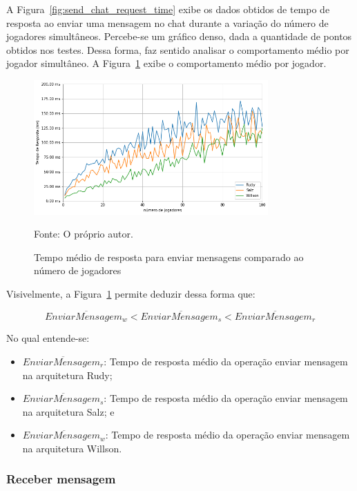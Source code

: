 A Figura~\ref{fig:send_chat_request_time} exibe os dados obtidos de tempo de resposta ao enviar uma mensagem no chat durante a variação do número de jogadores simultâneos.
%
Percebe-se um gráfico denso, dada a quantidade de pontos obtidos nos testes.
%
Dessa forma, faz sentido analisar o comportamento médio por jogador simultâneo.
%
A Figura~\ref{fig:send_chat_request_time_per_concurrency} exibe o comportamento médio por jogador.


\begin{figure}[htb!]
  \caption{Tempo médio de resposta para enviar mensagens comparado ao número de jogadores}
  \label{fig:send_chat_request_time_per_concurrency}
  \includegraphics[width=0.8\textwidth]{figuras/analise/rt/send_chat_request_time_per_concurrency}
  \centering

  Fonte: O próprio autor.
\end{figure}

Visivelmente, a Figura~\ref{fig:send_chat_request_time_per_concurrency} permite deduzir dessa forma que:

$$
  \overline{EnviarMensagem_{w}} < \overline{EnviarMensagem_{s}} <\overline{EnviarMensagem_{r}}
$$

No qual entende-se:

\begin{itemize}
 \item $\overline{EnviarMensagem_{r}}$: Tempo de resposta médio da operação enviar mensagem na arquitetura Rudy;
 \item $\overline{EnviarMensagem_{s}}$: Tempo de resposta médio da operação enviar mensagem na arquitetura Salz; e
 \item $\overline{EnviarMensagem_{w}}$: Tempo de resposta médio da operação enviar mensagem na arquitetura Willson.
\end{itemize}

\subsubsection{Receber mensagem}

